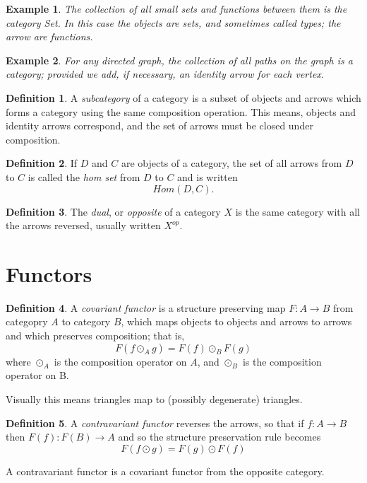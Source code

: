 \documentclass[oneside]{book}
\theoremstyle{plain}
\newtheorem{example}{Example}
\theoremstyle{definition}
\newtheorem{definition}{Definition}
\theoremstyle{plain}
\def\Hom{\mathit{Hom}}
\begin{document}
\begin{example}
The collection of all small sets and functions between them is 
the category {\em Set}.  In this case the objects are sets,
and sometimes called types; the arrow are functions.
\end{example}

\begin{example}
For any directed graph, the collection of
all paths on the graph is a category; provided we add, if necessary, an identity
arrow for each vertex.
\end{example}

\begin{definition}
A {\em subcategory} of a category is a subset of objects and arrows
which forms a category using the same composition operation. 
This means, objects and identity arrows correspond, 
and the set of arrows must be closed under composition.
\end{definition}

\begin{definition}
If $D$ and $C$ are objects of a category, the set of all arrows 
from $D$ to $C$ is called the {\em hom set} from $D$ to $C$
and is written
$$\Hom(D,C).$$
\end{definition}

\begin{definition}
The {\em dual}, or {\em opposite} of a category $X$ is the same
category with all the arrows reversed, usually written $X^{\mathit{op}}$.
\end{definition}

\section{Functors}
\begin{definition}
A {\em covariant functor} is a structure preserving map
$F:A\rightarrow B$ from
categopry $A$ to category $B$, which maps objects to objects and
arrows to arrows and which preserves composition; that is,
$$F(f\odot_A g) = F(f) \odot_B F(g)$$
where $\odot_A$ is the composition operator on $A$, 
and $\odot_B$ is the composition operator on B.
\end{definition}
Visually this means triangles map to (possibly degenerate) triangles.

\begin{definition}
A {\em contravariant functor} reverses the arrows, so that
if $f:A\rightarrow B$ then $F(f):F(B)\rightarrow A$ and so
the structure preservation rule becomes 
$$F(f\odot g) = F(g) \odot F(f)$$
\end{definition}
A contravariant functor is a covariant functor from the opposite
category.
\end{document}
